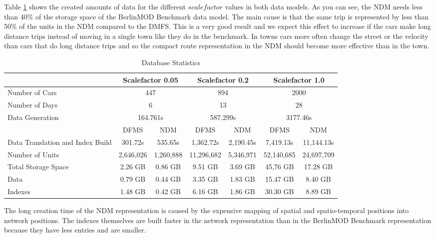 \documentclass[a4paper]{article}
\newcommand{\bmodb} {BerlinMOD Benchmark}
\begin{document}
{Table \ref{tab:dbstat} shows the created amounts of data for the different $scalefactor$
values in both data models. As you can see, the NDM needs less
than 40\% of the storage space of the \bmodb{} data model. The main cause is that
the same trip is represented by less than 50\% of the units in the NDM
compared to the DMFS. This is a very good result and we expect this effect to
increase if the cars make long distance
trips instead of moving in a single town like they do in the benchmark. In towns
cars more often change the street or the velocity than cars that do long distance
trips and so the compact route representation in the NDM should become
more effective than in the town.
\begin{table}[H]
\begin{center}
\begin{scriptsize}
\begin{tabularx}{1.0\textwidth}{|X|c|c|c|c|c|c|}
\hline
&\multicolumn{2}{c|}{\textbf{Scalefactor 0.05}}&\multicolumn{2}{c|}{\textbf{Scalefactor 0.2}}&\multicolumn{2}{c|}{\textbf{Scalefactor 1.0}}\\
\hline
Number of Cars&\multicolumn{2}{c|}{447}&\multicolumn{2}{c|}{894}&\multicolumn{2}{c|}{2000}\\
\hline
Number of Days&\multicolumn{2}{c|}{6}&\multicolumn{2}{c|}{13}&\multicolumn{2}{c|}{28}\\
\hline
Data Generation&\multicolumn{2}{c|}{164.761s}&\multicolumn{2}{c|}{587.299s}&\multicolumn{2}{c|}{3177.46s}\\
\hline
&DFMS&NDM&DFMS&NDM&DFMS&NDM\\
\hline
Data Translation
and Index Build&301.72s&535.65s&1,362.72s&2,190.45s&7,419.13s&11,144.13s\\
\hline
Number of Units&2,646,026&1,260,888&11,296,682&5,346,971&52,140,685&24,697,709\\
\hline
Total Storage Space&2.26 GB&0.86 GB&9.51 GB&3.69 GB&45,76 GB&17.28 GB\\
Data&0.79 GB&0.44 GB&3.35 GB&1.83 GB&15.47 GB& 8.40 GB\\
Indexes&1.48 GB&0.42 GB&6.16 GB&1.86 GB&30.30 GB&8.89 GB\\
\hline
\end{tabularx}
\end{scriptsize}
\caption{Database Statistics}
\label{tab:dbstat}
\end{center}
\end{table}
The long creation time of the NDM representation is
caused by the expensive mapping of spatial and spatio-temporal positions into
network positions. The indexes themselves are built faster in the network representation
than in the \bmodb{} representation because they have less entries and are smaller.

}
\end{document}
